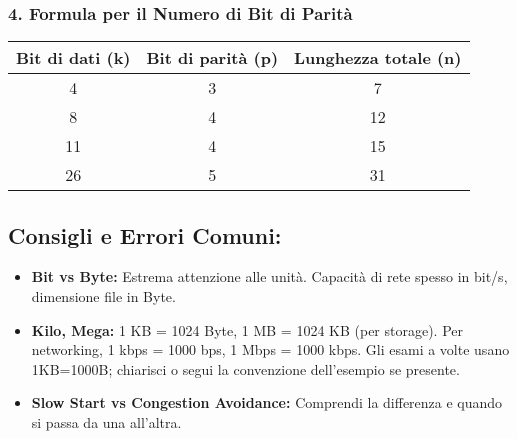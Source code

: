 \begin{center}
\end{center}

\subsubsection{4. Formula per il Numero di Bit di Parità}

\begin{center}

\vspace{0.5cm}
\begin{tabular}{|c|c|c|}
\hline
Bit di dati (k) & Bit di parità (p) & Lunghezza totale (n) \\
\hline
4 & 3 & 7 \\
8 & 4 & 12 \\
11 & 4 & 15 \\
26 & 5 & 31 \\
\hline
\end{tabular}
\end{center}


\subsection{Consigli e Errori Comuni:}
\begin{itemize}
    \item \textbf{Bit vs Byte:} Estrema attenzione alle unità. Capacità di rete spesso in bit/s, dimensione file in Byte.
    \item \textbf{Kilo, Mega:} 1 KB = 1024 Byte, 1 MB = 1024 KB (per storage). Per networking, 1 kbps = 1000 bps, 1 Mbps = 1000 kbps. Gli esami a volte usano 1KB=1000B; chiarisci o segui la convenzione dell'esempio se presente.
    \item \textbf{Slow Start vs Congestion Avoidance:} Comprendi la differenza e quando si passa da una all'altra.
\end{itemize}

